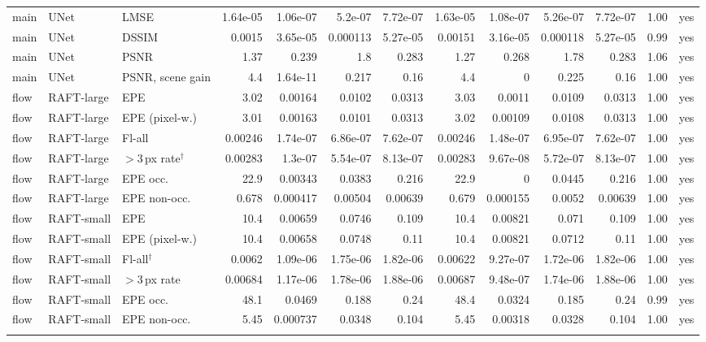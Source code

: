 \begin{table}[!p]
{\begin{tabular}{lllrrrrrrrrrl}
main & UNet & LMSE & 1.64e-05 & 1.06e-07 & 5.2e-07 & 7.72e-07 & 1.63e-05 & 1.08e-07 & 5.26e-07 & 7.72e-07 & 1.00 & yes \\
main & UNet & DSSIM & 0.0015 & 3.65e-05 & 0.000113 & 5.27e-05 & 0.00151 & 3.16e-05 & 0.000118 & 5.27e-05 & 0.99 & yes \\
main & UNet & PSNR & 1.37 & 0.239 & 1.8 & 0.283 & 1.27 & 0.268 & 1.78 & 0.283 & 1.06 & yes \\
main & UNet & PSNR, scene gain & 4.4 & 1.64e-11 & 0.217 & 0.16 & 4.4 & 0 & 0.225 & 0.16 & 1.00 & yes \\
\addlinespace
flow & RAFT-large & EPE & 3.02 & 0.00164 & 0.0102 & 0.0313 & 3.03 & 0.0011 & 0.0109 & 0.0313 & 1.00 & yes \\
flow & RAFT-large & EPE (pixel-w.) & 3.01 & 0.00163 & 0.0101 & 0.0313 & 3.02 & 0.00109 & 0.0108 & 0.0313 & 1.00 & yes \\
flow & RAFT-large & Fl-all & 0.00246 & 1.74e-07 & 6.86e-07 & 7.62e-07 & 0.00246 & 1.48e-07 & 6.95e-07 & 7.62e-07 & 1.00 & yes \\
flow & RAFT-large & $>$3\,px rate$^\dagger$ & 0.00283 & 1.3e-07 & 5.54e-07 & 8.13e-07 & 0.00283 & 9.67e-08 & 5.72e-07 & 8.13e-07 & 1.00 & yes \\
flow & RAFT-large & EPE occ. & 22.9 & 0.00343 & 0.0383 & 0.216 & 22.9 & 0 & 0.0445 & 0.216 & 1.00 & yes \\
flow & RAFT-large & EPE non-occ. & 0.678 & 0.000417 & 0.00504 & 0.00639 & 0.679 & 0.000155 & 0.0052 & 0.00639 & 1.00 & yes \\
\addlinespace
flow & RAFT-small & EPE & 10.4 & 0.00659 & 0.0746 & 0.109 & 10.4 & 0.00821 & 0.071 & 0.109 & 1.00 & yes \\
flow & RAFT-small & EPE (pixel-w.) & 10.4 & 0.00658 & 0.0748 & 0.11 & 10.4 & 0.00821 & 0.0712 & 0.11 & 1.00 & yes \\
flow & RAFT-small & Fl-all$^\dagger$ & 0.0062 & 1.09e-06 & 1.75e-06 & 1.82e-06 & 0.00622 & 9.27e-07 & 1.72e-06 & 1.82e-06 & 1.00 & yes \\
flow & RAFT-small & $>$3\,px rate & 0.00684 & 1.17e-06 & 1.78e-06 & 1.88e-06 & 0.00687 & 9.48e-07 & 1.74e-06 & 1.88e-06 & 1.00 & yes \\
flow & RAFT-small & EPE occ. & 48.1 & 0.0469 & 0.188 & 0.24 & 48.4 & 0.0324 & 0.185 & 0.24 & 0.99 & yes \\
flow & RAFT-small & EPE non-occ. & 5.45 & 0.000737 & 0.0348 & 0.104 & 5.45 & 0.00318 & 0.0328 & 0.104 & 1.00 & yes \\
\addlinespace
\bottomrule\end{tabular}}\end{table}
